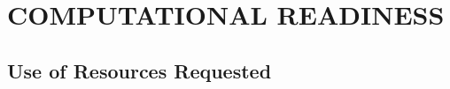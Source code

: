 \documentclass[11pt,letterpaper,english]{article}
\begin{document}
\vspace{-.25in}
\section{COMPUTATIONAL READINESS}
\vspace{-.2in}


\subsection{Use of Resources Requested}
\vspace{-.2in}

\end{document}
